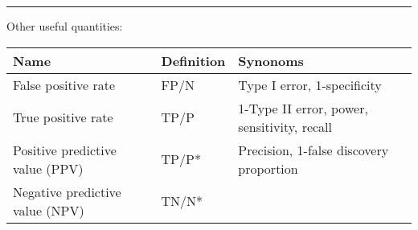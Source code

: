 \documentclass[
]{article}
\begin{document}
\begin{center}\rule{0.5\linewidth}{0.5pt}\end{center}

Other useful quantities:

\begin{longtable}[]{@{}lll@{}}
\toprule
\begin{minipage}[b]{0.36\columnwidth}\raggedright
Name\strut
\end{minipage} & \begin{minipage}[b]{0.20\columnwidth}\raggedright
Definition\strut
\end{minipage} & \begin{minipage}[b]{0.36\columnwidth}\raggedright
Synonoms\strut
\end{minipage}\tabularnewline
\midrule
\endhead
\begin{minipage}[t]{0.36\columnwidth}\raggedright
False positive rate\strut
\end{minipage} & \begin{minipage}[t]{0.20\columnwidth}\raggedright
FP/N\strut
\end{minipage} & \begin{minipage}[t]{0.36\columnwidth}\raggedright
Type I error, 1-specificity\strut
\end{minipage}\tabularnewline
\begin{minipage}[t]{0.36\columnwidth}\raggedright
True positive rate\strut
\end{minipage} & \begin{minipage}[t]{0.20\columnwidth}\raggedright
TP/P\strut
\end{minipage} & \begin{minipage}[t]{0.36\columnwidth}\raggedright
1-Type II error, power, sensitivity, recall\strut
\end{minipage}\tabularnewline
\begin{minipage}[t]{0.36\columnwidth}\raggedright
Positive predictive value (PPV)\strut
\end{minipage} & \begin{minipage}[t]{0.20\columnwidth}\raggedright
TP/P*\strut
\end{minipage} & \begin{minipage}[t]{0.36\columnwidth}\raggedright
Precision, 1-false discovery proportion\strut
\end{minipage}\tabularnewline
\begin{minipage}[t]{0.36\columnwidth}\raggedright
Negative predictive value (NPV)\strut
\end{minipage} & \begin{minipage}[t]{0.20\columnwidth}\raggedright
TN/N*\strut
\end{minipage} & \begin{minipage}[t]{0.36\columnwidth}\raggedright
\strut
\end{minipage}\tabularnewline
\bottomrule
\end{longtable}
\end{document}
